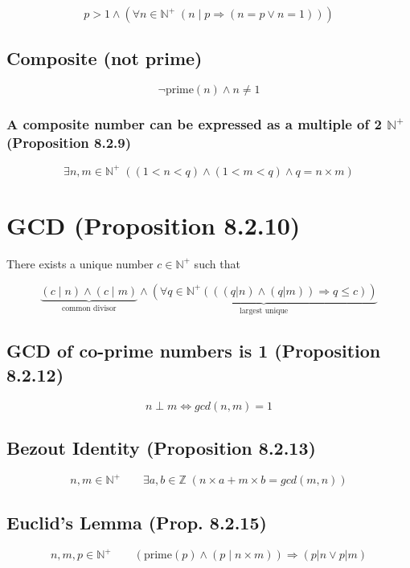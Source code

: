 \documentclass[12pt]{article}
\begin{document}
\begin{spacing}{1.5}
$$p > 1 \wedge (\forall n \in \mathbb{N}^+ \; (n \; | \; p \Rightarrow (n = p \vee n = 1)))$$

\subsection{Composite (not prime)}

$$\neg \text{prime}(n) \wedge n \neq 1$$

\subsubsection{A composite number can be expressed as a multiple of 2 $\mathbb{N}^+$ (Proposition 8.2.9)}

$$\exists n, m \in \mathbb{N}^+ \; ((1 < n < q) \wedge (1 < m < q) \wedge q = n \times m) $$

\section{GCD (Proposition 8.2.10)}

There exists a unique number $c \in \mathbb{N}^+$ such that

$$
\underbrace{(c \; | \; n) \wedge (c \; | \; m)}_{\textrm{common divisor}} \wedge 
\underbrace{(\forall q \in \mathbb{N}^+ (((q | n) \wedge (q | m)) \Rightarrow q \le c))}_{\text{largest unique}}$$

\subsection{GCD of co-prime numbers is 1 (Proposition 8.2.12)}

$$n \perp m \Leftrightarrow gcd(n, m) = 1$$

\subsection{Bezout Identity (Proposition 8.2.13)}

$$n, m \in \mathbb{N}^+ \qquad \exists a, b \in \mathbb{Z} \; (n \times a + m \times b = gcd(m, n))$$

\subsection{Euclid's Lemma (Prop. 8.2.15)}

$$n,m,p \in \mathbb{N}^+ \qquad 
(\text{prime}(p) \wedge (p \; | \; n \times m)) \Rightarrow (p | n \vee p | m)$$


\end{spacing}
\end{document}
